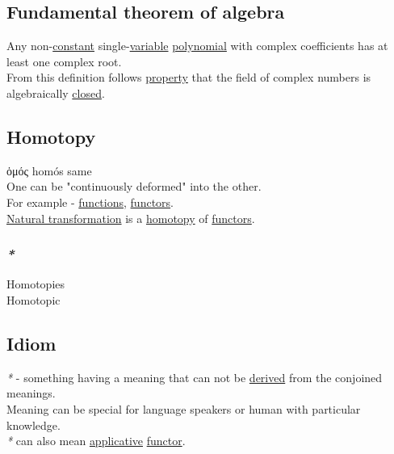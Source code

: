 \documentclass[11pt]{article}
\begin{document}
\subsection{\label{org6df35fd}Fundamental theorem of algebra}
\label{sec:org2c65689}
Any non-\hyperref[org74b57ec]{constant} single-\hyperref[org0b57594]{variable} \hyperref[orga488ca1]{polynomial} with complex coefficients has at least one complex root.\\

From this definition follows \hyperref[orgf8c3cc7]{property} that the field of complex numbers is algebraically \hyperref[orgcdd7006]{closed}.\\

\subsection{\label{orgb19d3ed}Homotopy}
\label{sec:orgd459e0f}
ὁμός homós same\\

One can be "continuously deformed" into the other.\\

For example - \hyperref[orgaa8fb87]{functions}, \hyperref[orgdd21ed6]{functors}.\\
\hyperref[orgc8e9bc9]{Natural transformation} is a \hyperref[orgb19d3ed]{homotopy} of \hyperref[orgdd21ed6]{functors}.\\

\subsubsection{\emph{*}}
\label{sec:org34a2fcf}

\label{org04a0f25}Homotopies\\
\label{orgc246b92}Homotopic\\

\subsection{\label{orgdbc30b2}Idiom}
\label{sec:org38b2684}
\emph{*} - something having a meaning that can not be \hyperref[org8c97145]{derived} from the conjoined meanings.\\
Meaning can be special for language speakers or human with particular knowledge.\\

\emph{*} can also mean \hyperref[org2dfdf4a]{applicative} \hyperref[orgf2f6841]{functor}.\\
\end{document}
